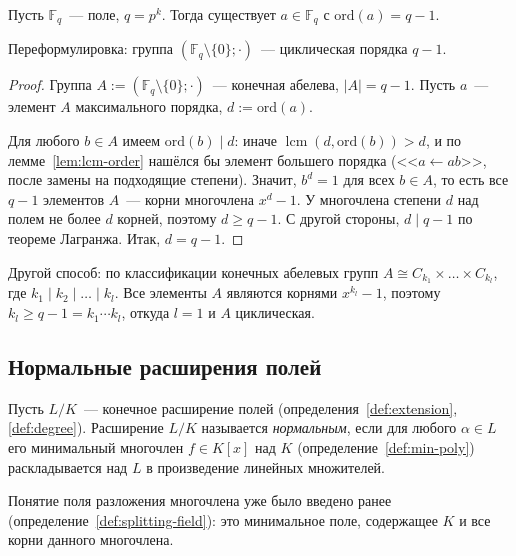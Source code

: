 \documentclass[12pt]{article}
\newcommand{\ord}{\text{ord}}
\begin{document}
    \begin{theorem}\label{thm:fq-cyclic}
    	Пусть $\mathbb{F}_q$~--- поле, $q = p^k$. Тогда существует $a \in \mathbb{F}_q$ с $\ord(a) = q - 1$.

    	Переформулировка: группа $(\mathbb{F}_q \setminus \{ 0 \}; \cdot)$~--- циклическая порядка $q - 1$.
    \end{theorem}
    \begin{proof}
    	Группа $A := (\mathbb{F}_q \setminus \{0\}; \cdot)$~--- конечная абелева, $|A| = q - 1$. Пусть $a$~--- элемент $A$ максимального порядка, $d := \ord(a)$.

    	Для любого $b \in A$ имеем $\ord(b) \mid d$: иначе $\operatorname{lcm}(d, \ord(b)) > d$, и по лемме~\ref{lem:lcm-order} нашёлся бы элемент большего порядка (<<$a \leftarrow ab$>>, после замены на подходящие степени). Значит, $b^d = 1$ для всех $b \in A$, то есть все $q - 1$ элементов $A$~--- корни многочлена $x^d - 1$. У многочлена степени $d$ над полем не более $d$ корней, поэтому $d \geqslant q - 1$. С другой стороны, $d \mid q - 1$ по теореме Лагранжа. Итак, $d = q - 1$.
    \end{proof}

    \begin{note}
    	Другой способ: по классификации конечных абелевых групп $A \cong C_{k_1} \times \ldots \times C_{k_l}$, где $k_1 \mid k_2 \mid \ldots \mid k_l$. Все элементы $A$ являются корнями $x^{k_l} - 1$, поэтому $k_l \geqslant q - 1 = k_1 \cdots k_l$, откуда $l = 1$ и $A$ циклическая.
    \end{note}
    
	\subsection{Нормальные расширения полей}

	\begin{definition}\label{def:normal-extension}
		Пусть $L/K$~--- конечное расширение полей (определения~\ref{def:extension}, \ref{def:degree}). Расширение $L/K$ называется \emph{нормальным}, если для любого $\alpha \in L$ его минимальный многочлен $f \in K[x]$ над $K$ (определение~\ref{def:min-poly}) раскладывается над $L$ в произведение линейных множителей.
	\end{definition}

	\begin{note}
		Понятие поля разложения многочлена уже было введено ранее (определение~\ref{def:splitting-field}): это минимальное поле, содержащее $K$ и все корни данного многочлена.
	\end{note}
\end{document}
